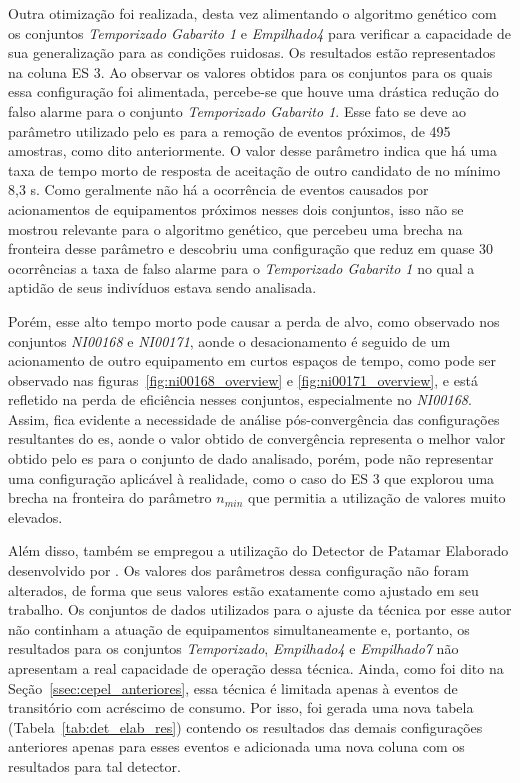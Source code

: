 Outra otimização foi realizada, desta vez alimentando o algoritmo
genético com os conjuntos \emph{Temporizado Gabarito 1} e
\emph{Empilhado4} para verificar a capacidade de sua generalização
para as condições ruidosas. Os resultados estão representados na
coluna ES 3. Ao observar os valores obtidos para os conjuntos para os
quais essa configuração foi alimentada, percebe-se que houve uma
drástica redução do falso alarme para o conjunto \emph{Temporizado
Gabarito 1}. Esse fato se deve ao parâmetro utilizado pelo \acs{es}
para a remoção de eventos próximos, de 495 amostras, como dito
anteriormente. O valor desse parâmetro indica que há uma taxa de tempo
morto de resposta de aceitação de outro candidato de no mínimo 8,3 s.
Como geralmente não há a ocorrência de eventos causados por
acionamentos de equipamentos próximos nesses dois conjuntos, isso não
se mostrou relevante para o algoritmo genético, que percebeu uma
brecha na fronteira desse parâmetro e descobriu uma configuração que
reduz em quase 30 ocorrências a taxa de falso alarme para o
\emph{Temporizado Gabarito 1} no qual a aptidão de seus indivíduos
estava sendo analisada.

Porém, esse alto tempo morto pode causar a
perda de alvo, como observado nos conjuntos \emph{NI00168} e
\emph{NI00171}, aonde o desacionamento é seguido de um acionamento de
outro equipamento em curtos espaços de tempo, como pode ser observado
nas figuras~\ref{fig:ni00168_overview} e \ref{fig:ni00171_overview}, e
está refletido na perda de eficiência nesses conjuntos, especialmente
no \emph{NI00168}. Assim, fica evidente a necessidade de análise
pós-convergência das configurações resultantes do \acs{es}, aonde o
valor obtido de convergência representa o melhor valor obtido pelo
\acs{es} para o conjunto de dado analisado, porém, pode não
representar uma configuração aplicável à realidade, como o caso do ES
3 que explorou uma brecha na fronteira do parâmetro $n_{min}$ que
permitia a utilização de valores muito elevados.

Além disso, também se empregou a utilização do Detector de Patamar
Elaborado desenvolvido por \citet*{nilm_cepel_alvaro}. Os valores dos
parâmetros dessa configuração não foram alterados, de forma que seus
valores estão exatamente como ajustado em seu trabalho. Os conjuntos de
dados utilizados para o ajuste da técnica por esse autor não continham
a atuação de equipamentos simultaneamente e, portanto, os resultados
para os conjuntos \emph{Temporizado}, \emph{Empilhado4} e
\emph{Empilhado7} não apresentam a real capacidade de operação dessa
técnica. Ainda, como foi dito na
Seção~\ref{ssec:cepel_anteriores}, essa técnica é limitada apenas à
eventos de transitório com acréscimo de consumo. Por isso, foi gerada
uma nova tabela (Tabela~\ref{tab:det_elab_res}) contendo os resultados
das demais configurações anteriores apenas para esses eventos e
adicionada uma nova coluna com os resultados para tal detector.

